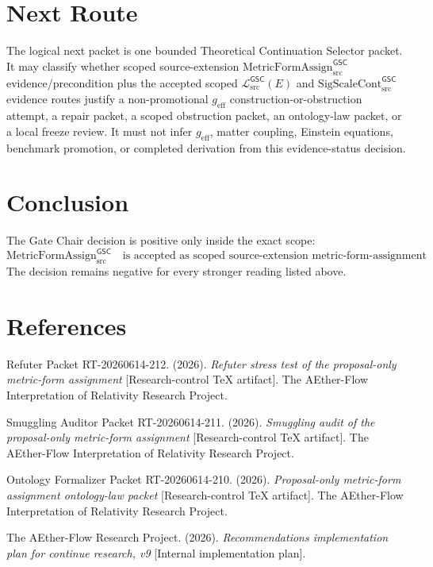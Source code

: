 \documentclass[11pt]{article}
\newcommand{\MetricData}{\mathcal{L}_{\mathrm{src}}^{\mathsf{GSC}}}
\newcommand{\geff}{g_{\mathrm{eff}}}
\newcommand{\SigScaleCont}{\mathrm{SigScaleCont}_{\mathrm{src}}^{\mathsf{GSC}}}
\newcommand{\MetricFormAssign}{\mathrm{MetricFormAssign}_{\mathrm{src}}^{\mathsf{GSC}}}
\begin{document}
\section{Next Route}

The logical next packet is one bounded Theoretical Continuation Selector
packet. It may classify whether scoped source-extension
\(\MetricFormAssign\) evidence/precondition plus the accepted scoped
\(\MetricData(E)\) and \(\SigScaleCont\) evidence routes justify a
non-promotional \(\geff\) construction-or-obstruction attempt, a repair
packet, a scoped obstruction packet, an ontology-law packet, or a local freeze
review. It must not infer \(\geff\), matter coupling, Einstein equations,
benchmark promotion, or completed derivation from this evidence-status
decision.

\section{Conclusion}

The Gate Chair decision is positive only inside the exact scope:
\[
\MetricFormAssign
\quad\text{is accepted as scoped source-extension metric-form-assignment evidence/precondition.}
\]
The decision remains negative for every stronger reading listed above.

\section{References}

Refuter Packet RT-20260614-212. (2026). \emph{Refuter stress test of the
proposal-only metric-form assignment} [Research-control TeX artifact]. The
AEther-Flow Interpretation of Relativity Research Project.

Smuggling Auditor Packet RT-20260614-211. (2026). \emph{Smuggling audit of
the proposal-only metric-form assignment} [Research-control TeX artifact]. The
AEther-Flow Interpretation of Relativity Research Project.

Ontology Formalizer Packet RT-20260614-210. (2026). \emph{Proposal-only
metric-form assignment ontology-law packet} [Research-control TeX artifact].
The AEther-Flow Interpretation of Relativity Research Project.

The AEther-Flow Research Project. (2026). \emph{Recommendations implementation
plan for continue research, v9} [Internal implementation plan].
\end{document}
